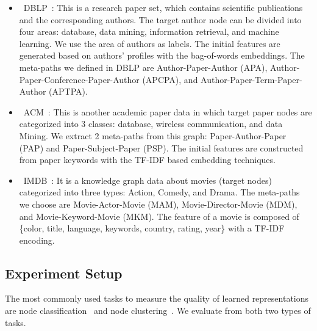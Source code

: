 \documentclass[conference]{IEEEtran}
\begin{document}
	\begin{itemize}[leftmargin=*]
\item~DBLP~\cite{GLFSH09}: This is a research paper set, which contains scientific publications and the corresponding authors. The target author node can be divided into four areas: database, data mining, information retrieval, and machine learning. We use the area of authors as labels. The initial features are generated based on authors' profiles with the bag-of-words embeddings.
		The meta-paths we defined in DBLP are Author-Paper-Author (APA), Author-Paper-Conference-Paper-Author (APCPA), and Author-Paper-Term-Paper-Author (APTPA).
\item~ACM~\cite{WJSWCYY19}: This is another academic paper data in which target paper nodes are categorized into 3 classes: database, wireless communication, and data Mining. We extract 2 meta-paths from this graph: Paper-Author-Paper (PAP) and Paper-Subject-Paper (PSP). 
		The initial features are constructed from paper keywords with the TF-IDF based embedding techniques.
\item~IMDB~\cite{wu2016explaining}: It is a knowledge graph data about movies (target nodes) categorized into three types: Action, Comedy, and Drama. The meta-paths we choose are Movie-Actor-Movie (MAM), Movie-Director-Movie (MDM), and Movie-Keyword-Movie (MKM). 
		The feature of a movie is composed of \{color, title, language, keywords, country, rating, year\} with a TF-IDF encoding. 


	\end{itemize}
	
	
	
	
\subsection{Experiment Setup}
The most commonly used tasks to measure the quality of learned representations are node classification~\cite{PAS14,GL16,HYL17b} and node clustering~\cite{DCS17,WJSWCYY19}. We evaluate {\our} from both two types of tasks.
\end{document}
